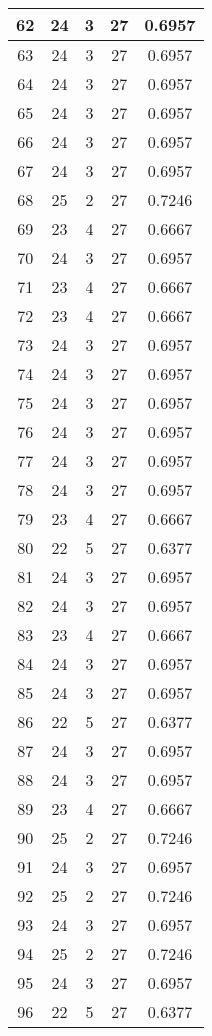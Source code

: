 \documentclass[letterpaper, 12pt]{article}
\begin{document}
\begin{longtable}{|c|c|c|c|c|}
\hline
62 & 24 & 3 & 27 & 0.6957 \\
\hline
63 & 24 & 3 & 27 & 0.6957 \\
\hline
64 & 24 & 3 & 27 & 0.6957 \\
\hline
65 & 24 & 3 & 27 & 0.6957 \\
\hline
66 & 24 & 3 & 27 & 0.6957 \\
\hline
67 & 24 & 3 & 27 & 0.6957 \\
\hline
68 & 25 & 2 & 27 & 0.7246 \\
\hline
69 & 23 & 4 & 27 & 0.6667 \\
\hline
70 & 24 & 3 & 27 & 0.6957 \\
\hline
71 & 23 & 4 & 27 & 0.6667 \\
\hline
72 & 23 & 4 & 27 & 0.6667 \\
\hline
73 & 24 & 3 & 27 & 0.6957 \\
\hline
74 & 24 & 3 & 27 & 0.6957 \\
\hline
75 & 24 & 3 & 27 & 0.6957 \\
\hline
76 & 24 & 3 & 27 & 0.6957 \\
\hline
77 & 24 & 3 & 27 & 0.6957 \\
\hline
78 & 24 & 3 & 27 & 0.6957 \\
\hline
79 & 23 & 4 & 27 & 0.6667 \\
\hline
80 & 22 & 5 & 27 & 0.6377 \\
\hline
81 & 24 & 3 & 27 & 0.6957 \\
\hline
82 & 24 & 3 & 27 & 0.6957 \\
\hline
83 & 23 & 4 & 27 & 0.6667 \\
\hline
84 & 24 & 3 & 27 & 0.6957 \\
\hline
85 & 24 & 3 & 27 & 0.6957 \\
\hline
86 & 22 & 5 & 27 & 0.6377 \\
\hline
87 & 24 & 3 & 27 & 0.6957 \\
\hline
88 & 24 & 3 & 27 & 0.6957 \\
\hline
89 & 23 & 4 & 27 & 0.6667 \\
\hline
90 & 25 & 2 & 27 & 0.7246 \\
\hline
91 & 24 & 3 & 27 & 0.6957 \\
\hline
92 & 25 & 2 & 27 & 0.7246 \\
\hline
93 & 24 & 3 & 27 & 0.6957 \\
\hline
94 & 25 & 2 & 27 & 0.7246 \\
\hline
95 & 24 & 3 & 27 & 0.6957 \\
\hline
96 & 22 & 5 & 27 & 0.6377 \\

\end{longtable}
\end{document}
